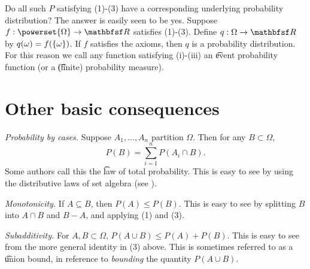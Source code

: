 Do all such $P$ satisfying (1)-(3) have a corresponding underlying probability distribution?
The answer is easily seen to be yes.
Suppose $f: \powerset{\Omega } \to \R $ satisfies (1)-(3).
Define $q: \Omega  \to \R $ by $q(\omega ) = f(\{\omega \})$.
If $f$ satisfies the axioms, then $q$ is a probability distribution.
For this reason we call any function satisfying (i)-(iii) an \t{event probability function} (or a \t{(finite) probability measure}).

\section*{Other basic consequences}

\textit{Probability by cases.}
Suppose $A_1, \dots , A_n$ partition $\Omega $.
Then for any $B \subset \Omega $,
\[
\textstyle
P(B) = \sum_{i = 1}^{n} P(A_i \cap  B).
\]
Some authors call this the \t{law of total probability}.
This is easy to see by using the distributive laws of set algebra (see ).

\textit{Monotonicity.}
If $A \subseteq B$, then $P(A) \leq P(B)$.
This is easy to see by splitting $B$ into $A \cap  B$ and $B - A$, and applying (1) and (3).

\textit{Subadditivity.}
For $A, B \subset \Omega $, $P(A \cup B) \leq P(A) + P(B)$.
This is easy to see from the more general identity in (3) above.
This is sometimes referred to as a \t{union bound}, in reference to \textit{bounding} the quantity $P(A \cup B)$.
